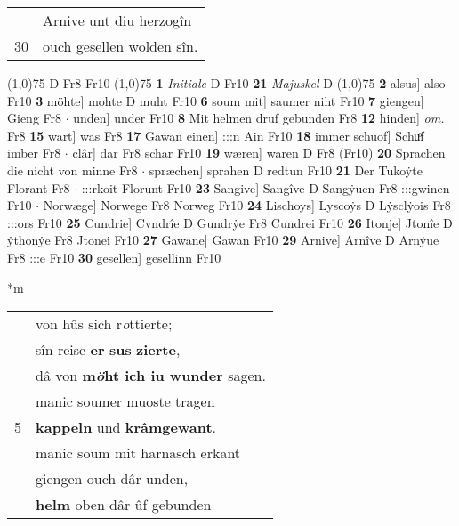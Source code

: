 \documentclass[8pt,a4paper,notitlepage]{article}
\begin{document}
\begin{table}[ht]
\begin{minipage}[t]{0.5\linewidth}
\begin{tabular}{rl}
 & Arnive unt diu herzogîn\\ 
30 & ouch gesellen wolden sîn.\\ 
\end{tabular}
\scriptsize
\line(1,0){75} \newline
D Fr8 Fr10 \newline
\line(1,0){75} \newline
\textbf{1} \textit{Initiale} D Fr10  \textbf{21} \textit{Majuskel} D  \newline
\line(1,0){75} \newline
\textbf{2} alsus] also Fr10 \textbf{3} möhte] mohte D muht Fr10 \textbf{6} soum mit] saumer niht Fr10 \textbf{7} giengen] Gieng Fr8  $\cdot$ unden] under Fr10 \textbf{8} Mit helmen druf gebunden Fr8 \textbf{12} hinden] \textit{om.} Fr8 \textbf{15} wart] was Fr8 \textbf{17} Gawan einen] :::n Ain Fr10 \textbf{18} immer schuof] Schuͦf imber Fr8  $\cdot$ clâr] dar Fr8 schar Fr10 \textbf{19} wæren] waren D Fr8 (Fr10) \textbf{20} Sprachen die nicht von minne Fr8  $\cdot$ spræchen] sprahen D redtun Fr10 \textbf{21} Der Tukoẏte Florant Fr8  $\cdot$ :::rkoit Florunt Fr10 \textbf{23} Sangive] Sangîve D Sangẏuen Fr8 :::gwinen Fr10  $\cdot$ Norwæge] Norwege Fr8 Norweg Fr10 \textbf{24} Lischoys] Lyscoẏs D Lẏsclẏois Fr8 :::ors Fr10 \textbf{25} Cundrie] Cvndrîe D Gundrẏe Fr8 Cundrei Fr10 \textbf{26} Itonje] Jtonîe D ẏthonẏe Fr8 Jtonei Fr10 \textbf{27} Gawane] Gawan Fr10 \textbf{29} Arnive] Arnîve D Arnẏue Fr8 :::e Fr10 \textbf{30} gesellen] gesellinn Fr10 \newline
\end{minipage}
\hspace{0.5cm}
\begin{minipage}[t]{0.5\linewidth}
\small
\begin{center}*m
\end{center}
\begin{tabular}{rl}
 & von hûs sich r\textit{o}ttierte;\\ 
 & sîn reise \textbf{er} \textbf{sus} \textbf{zierte},\\ 
 & dâ von \textbf{m\textit{ö}ht ich iu wunder} sagen.\\ 
 & manic soumer muoste tragen\\ 
5 & \textbf{kappeln} und \textbf{krâmgewant}.\\ 
 & manic soum mit harnasch erkant\\ 
 & giengen ouch dâr unden,\\ 
 & \textbf{helm} oben dâr ûf gebunden\\ 

\end{tabular}
\end{minipage}
\end{table}
\end{document}
